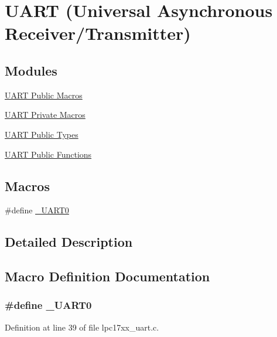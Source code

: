 \hypertarget{group___u_a_r_t}{}\section{U\+A\+RT (Universal Asynchronous Receiver/\+Transmitter)}
\label{group___u_a_r_t}
\subsection*{Modules}
\begin{DoxyCompactItemize}
\item 
\hyperlink{group___u_a_r_t___public___macros}{U\+A\+R\+T Public Macros}
\item 
\hyperlink{group___u_a_r_t___private___macros}{U\+A\+R\+T Private Macros}
\item 
\hyperlink{group___u_a_r_t___public___types}{U\+A\+R\+T Public Types}
\item 
\hyperlink{group___u_a_r_t___public___functions}{U\+A\+R\+T Public Functions}
\end{DoxyCompactItemize}
\subsection*{Macros}
\begin{DoxyCompactItemize}
\item 
\#define \hyperlink{group___u_a_r_t_ga9336c91e175ba088cc544ac1452e2ab3}{\+\_\+\+U\+A\+R\+T0}
\end{DoxyCompactItemize}


\subsection{Detailed Description}


\subsection{Macro Definition Documentation}
\subsubsection[{\texorpdfstring{\+\_\+\+U\+A\+R\+T0}{_UART0}}]{\setlength{\rightskip}{0pt plus 5cm}\#define \+\_\+\+U\+A\+R\+T0}\hypertarget{group___u_a_r_t_ga9336c91e175ba088cc544ac1452e2ab3}{}\label{group___u_a_r_t_ga9336c91e175ba088cc544ac1452e2ab3}


Definition at line 39 of file lpc17xx\+\_\+uart.\+c.

